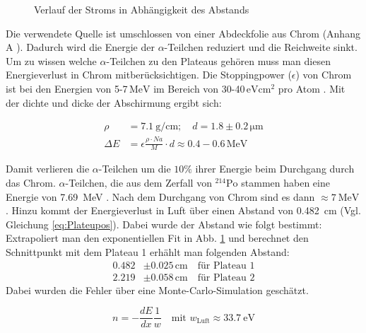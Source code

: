 \begin{figure}[h]
    \centering
    
    \caption{Verlauf der Stroms in Abhängigkeit des Abstands}
    \label{fig:Absorpt_Blei}
\end{figure}


Die verwendete Quelle ist umschlossen von einer Abdeckfolie aus Chrom (Anhang A \cite{Versuchsanleitung}). Dadurch wird die Energie der $\alpha$-Teilchen reduziert und die Reichweite sinkt. Um zu wissen welche $\alpha$-Teilchen zu den Plateaus gehören muss man diesen Energieverlust in Chrom mitberücksichtigen. Die Stoppingpower ($\epsilon$) von Chrom ist bei den Energien von 5-7$\,\si{\MeV}$ im Bereich von 30-40$\,\si{\eV\cm^2}$ pro Atom \cite{MasstoppingpowerCr}. Mit der dichte und dicke der Abschirmung ergibt sich:
\begin{center}
    \begin{align}
        \nonumber
        \rho &= \SI{7.1}{\g\per\cm}; \quad d= 1.8\pm{0.2}\,\si{\micro\meter}\\\nonumber
        \Delta E &= \epsilon \frac{\rho \cdot Na}{M}\cdot d \approx 0.4-0.6\,\si{\MeV} \nonumber
    \end{align}
\end{center}

Damit verlieren die $\alpha$-Teilchen um die $10\%$ ihrer Energie beim Durchgang durch das Chrom. $\alpha$-Teilchen, die aus dem Zerfall von $^{214}\text{Po}$ stammen haben eine Energie von \SI{7.69}{\MeV} \cite{Versuchsanleitung}. Nach dem Durchgang von Chrom sind es dann $\approx \SI{7}{\MeV}$. Hinzu kommt der Energieverlust in Luft über einen Abstand von \SI{0.482}{\cm} (Vgl. Gleichung \ref{eq:Plateupos}). Dabei wurde der Abstand wie folgt bestimmt:
Extrapoliert man den exponentiellen Fit in Abb. \ref{fig:Absorpt_Blei} und berechnet den Schnittpunkt mit dem Plateau 1 erhählt man folgenden Abstand:
\begin{align}
    0.482 &\pm 0.025\, \si{\cm}\quad \text{für Plateau 1}\\
    2.219 &\pm 0.058\, \si{\cm}\quad \text{für Plateau 2}
    \label{eq:Plateupos}
\end{align}
Dabei wurden die Fehler über eine Monte-Carlo-Simulation geschätzt. 



\begin{equation}
    \boxed{
       n = -\frac{dE}{dx}\frac{1}{w} \quad \text{mit } w_{\text{Luft}}\approx \SI{33.7}{\eV}
    }
\end{equation}





